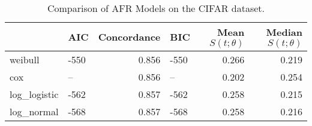 \begin{table}
\caption{Comparison of AFR Models on the CIFAR dataset.}
\label{tab:cifar}
\begin{tabular}{llrlrr}
\toprule
 & AIC & Concordance & BIC & Mean $S(t;\theta)$ & Median $S(t;\theta)$ \\
\midrule
weibull & -550 & 0.856 & -550 & 0.266 & 0.219 \\
cox & -- & 0.856 & -- & 0.202 & 0.254 \\
log_logistic & -562 & 0.857 & -562 & 0.258 & 0.215 \\
log_normal & -568 & 0.857 & -568 & 0.258 & 0.216 \\
\bottomrule
\end{tabular}
\end{table}

